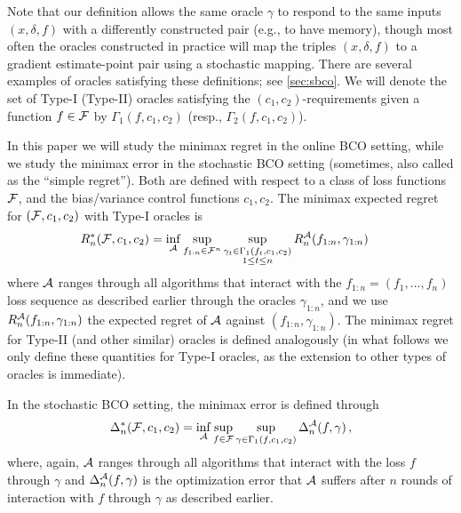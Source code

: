 Note that our definition allows the same oracle $\gamma$ to respond to the same inputs $(x,\delta,f)$ with a differently constructed pair (e.g., to have memory),
though most often the oracles constructed in practice
will map the triples $(x,\delta,f)$ to a gradient estimate-point pair using a stochastic mapping.
There are several examples of oracles satisfying these definitions; see \cref{sec:sbco}.
We will denote the set of Type-I (Type-II) oracles satisfying the $(c_1,c_2)$-requirements given a function $f\in \mathcal{F}$ by $\Gamma_1(f,c_1,c_2)$ (resp., $\Gamma_2(f,c_1,c_2)$).

In this paper we will study the minimax regret in the online BCO setting, while we study the minimax error in the stochastic BCO setting (sometimes, also called as the ``simple regret'').
Both are defined with respect to a class of loss functions $\mathcal{F}$, and the bias/variance control functions $c_1,c_2$.
The minimax expected regret for $(\mathcal{F},c_1,c_2)$ with Type-I oracles is
\begin{align}
R_n^*(\mathcal{F},c_1,c_2)
&= \inf_{\mathcal{A}} \sup_{f_{1:n}\in \mathcal{F}^n}
	\sup_{\substack{\gamma_t \in \Gamma_1(f_t,c_1,c_2)\\1\le t \le n}} R_n^{\mathcal{A}}(f_{1:n},\gamma_{1:n})
\label{eq:minimaxregdef}
\end{align}
where $\mathcal{A}$ ranges through all algorithms that interact with the $f_{1:n}= (f_1,\dots,f_n)$ loss sequence
as described earlier
through the oracles $\gamma_{1:n}$,
and we use $R_n^{\mathcal{A}}(f_{1:n},\gamma_{1:n})$ the expected regret of $\mathcal{A}$ against $(f_{1:n},\gamma_{1:n})$.
The minimax regret for Type-II (and other similar) oracles is defined analogously (in what follows we only define these quantities for Type-I oracles, as the extension to other types of oracles is immediate).

In the stochastic BCO setting, the minimax error is defined through
\begin{align}
\label{eq:minimaxerrdef}
\Delta_n^*(\mathcal{F},c_1,c_2)
= \inf_{\mathcal{A}} \sup_{f \in \mathcal{F}} \sup_{\gamma\in \Gamma_1(f,c_1,c_2)}  \Delta_n^{\mathcal{A}}(f,\gamma)\,,
\end{align}
where, again, $\mathcal{A}$ ranges through all algorithms that interact with the loss $f$ through $\gamma$ and
$\Delta_n^{\mathcal{A}}(f,\gamma)$ is the optimization error that $\mathcal{A}$ suffers
after $n$ rounds of interaction with $f$ through $\gamma$ as described earlier.

